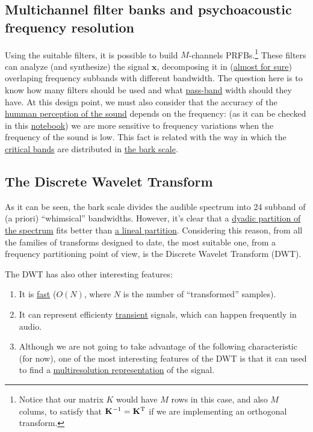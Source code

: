 \subsection{Multichannel filter banks and psychoacoustic frequency resolution}
Using the suitable filters, it is possible to build $M$-channels
PRFBs.\footnote{Notice that our matrix $K$ would have $M$ rows in this
  case, and also $M$ colums, to satisfy that
  ${\mathbf K}^{-1}={\mathbf K}^{\text T}$ if we are implementing an
  orthogonal transform.}  These filters can analyze (and synthesize)
the signal ${\mathbf x}$, decomposing it in
(\href{https://en.wikipedia.org/wiki/Low-pass_filter#Ideal_and_real_filters}{almost
  for sure}) overlaping frequency subbands with different
bandwidth. The question here is to know how many filters should be
used and what
\href{https://en.wikipedia.org/wiki/Band-pass_filter}{pass-band} width
should they have. At this design point, we must also consider that the
accuracy of the
\href{https://en.wikipedia.org/wiki/Psychoacoustics}{humman perception
  of the sound} depends on the frequency: (as it can be checked in
this
\href{https://github.com/Tecnologias-multimedia/intercom/blob/master/docs/frequency_resolution.ipynb}{notebook})
we are more sensitive to frequency variations when the frequency of
the sound is low. This fact is related with the way in which the
\href{https://en.wikipedia.org/wiki/Critical_band}{critical bands} are
distributed in \href{https://en.wikipedia.org/wiki/Bark_scale}{the
  bark scale}.

\subsection{The Discrete Wavelet Transform}
As it can be seen, the bark scale divides the audible spectrum into 24
subband of (a priori) ``whimsical'' bandwidths. However, it's clear
that a \href{https://en.wikipedia.org/wiki/Octave_band}{dyadic
  partition of the spectrum} fits better than
\href{https://en.wikipedia.org/wiki/Wavelet_transform#Principle}{a
  lineal partition}. Considering this reason, from all the families of
transforms designed to date, the most suitable one, from a frequency
partitioning point of view, is the Discrete Wavelet Transform (DWT).

The DWT has also other interesting features:
\begin{enumerate}
\item It is
  \href{https://en.wikipedia.org/wiki/Discrete_wavelet_transform#Time_complexity}{fast}
  ($O(N)$, where $N$ is the number of ``transformed'' samples).
\item It can represent efficienty
  \href{https://en.wikipedia.org/wiki/Transient_(oscillation)}{transient}
  signals, which can happen frequently in audio.
\item Although we are not going to take advantage of the following
  characteristic (for now), one of the most interesting features of
  the DWT is that it can used to find a
  \href{https://en.wikipedia.org/wiki/Multiresolution_analysis}{multiresolution
    representation} of the signal.
\end{enumerate}

